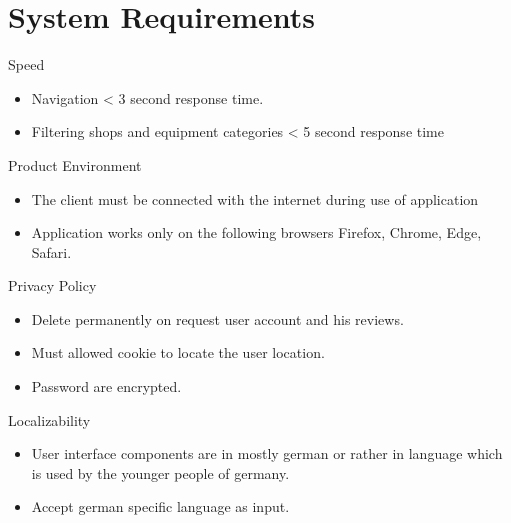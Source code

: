 \section{System Requirements}
Speed
\begin{itemize}
\item Navigation < 3 second response time.
\item  Filtering shops and equipment categories < 5 second response time
\end{itemize}
\vspace*{1cm}
Product Environment
\begin{itemize}
\item The client must be connected with the internet during use of application
\item Application works only on the following browsers {Firefox, Chrome, Edge, Safari}.
\end{itemize}
\vspace*{1cm}
Privacy Policy
\begin{itemize}
\item Delete permanently on request user account and his reviews.
\item Must allowed cookie to locate the user location.
\item Password are encrypted.
\end{itemize}
\vspace*{1cm}
Localizability 
\begin{itemize}
\item User interface components are in mostly german or rather in language which is used by the younger people of germany. 
\item Accept german specific language as input.
\end{itemize}